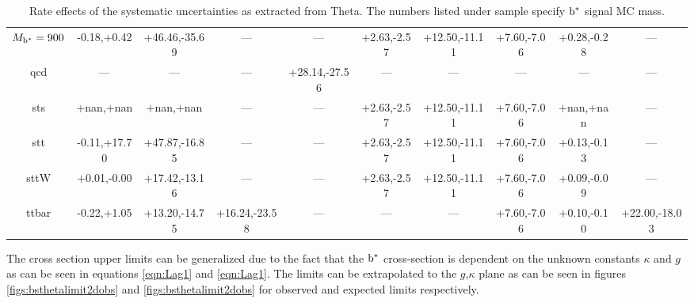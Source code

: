 \begin{table}
\begin{center}
{\begin{tabular}{|c||c|c|c|c|c|c|c|c|c|}
$M_{\mathrm{b}^{*}}=900$ & -0.18,+0.42 & +46.46,-35.69 & --- & --- & +2.63,-2.57 & +12.50,-11.11 & +7.60,-7.06 & +0.28,-0.28 & ---\\ 
qcd & --- & --- & --- & +28.14,-27.56 & --- & --- & --- & --- & ---\\ 
sts & +nan,+nan & +nan,+nan & --- & --- & +2.63,-2.57 & +12.50,-11.11 & +7.60,-7.06 & +nan,+nan & ---\\ 
stt & -0.11,+17.70 & +47.87,-16.85 & --- & --- & +2.63,-2.57 & +12.50,-11.11 & +7.60,-7.06 & +0.13,-0.13 & ---\\ 
sttW & +0.01,-0.00 & +17.42,-13.16 & --- & --- & +2.63,-2.57 & +12.50,-11.11 & +7.60,-7.06 & +0.09,-0.09 & ---\\ 
ttbar & -0.22,+1.05 & +13.20,-14.75 & +16.24,-23.58 & --- & --- & --- & +7.60,-7.06 & +0.10,-0.10 & +22.00,-18.03\\ 
\hline
\end{tabular}
}
\end{center}
\caption{Rate effects of the systematic uncertainties as extracted from Theta.  The numbers listed under sample specify $\mathrm{b}^{*}$ signal MC mass.}
\label{table:bsnuisance}
\end{table}



The cross section upper limits can be generalized due to the fact that the $\mathrm{b}^{*}$ cross-section is dependent on the unknown constants $\kappa$ and $g$ as can be seen in equations \ref{eqn:Lag1} and \ref{eqn:Lag1}.
The limits can be extrapolated to the $g$,$\kappa$ plane as can be seen in figures \ref{figs:bsthetalimit2dobs} and \ref{figs:bsthetalimit2dobs} for observed and expected limits respectively.




